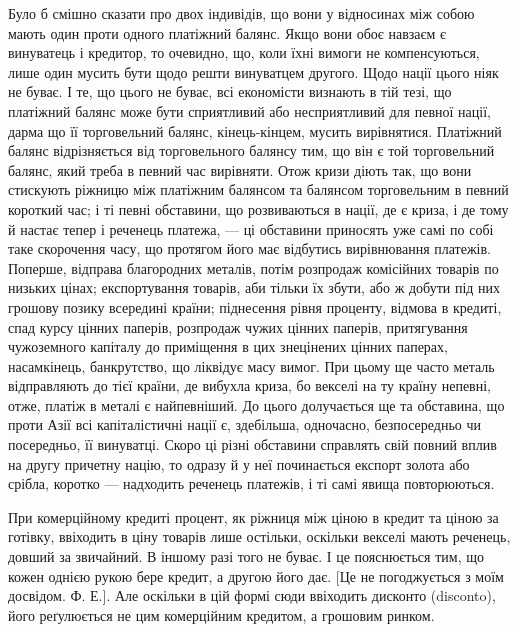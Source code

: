 Було б смішно сказати про двох індивідів, що вони у відносинах між собою
мають один проти одного платіжний балянс. Якщо вони обоє навзаєм є
винуватець і кредитор, то очевидно, що, коли їхні вимоги не компенсуються,
лише один мусить бути щодо решти винуватцем другого. Щодо нації цього
ніяк не буває. І те, що цього не буває, всі економісти визнають в тій тезі,
що платіжний балянс може бути сприятливий або несприятливий для певної
нації, дарма що її торговельний балянс, кінець-кінцем, мусить вирівнятися.
Платіжний балянс відрізняється від торговельного балянсу тим, що він є той
торговельний балянс, який треба в певний час вирівняти. Отож кризи діють так,
що вони стискують ріжницю між платіжним балянсом та балянсом торговельним
в певний короткий час; і ті певні обставини, що розвиваються в нації, де є
криза, і де тому й настає тепер і реченець платежа, — ці обставини приносять уже
самі по собі таке скорочення часу, що протягом його має відбутись вирівнювання
платежів. Поперше, відправа благородних металів, потім розпродаж комісійних
товарів по низьких цінах; експортування товарів, аби тільки їх збути, або ж
добути під них грошову позику всередині країни; піднесення рівня проценту,
відмова в кредиті, спад курсу цінних паперів, розпродаж чужих цінних паперів,
притягування чужоземного капіталу до приміщення в цих знецінених цінних
паперах, насамкінець, банкрутство, що ліквідує масу вимог. При цьому ще часто
металь відправляють до тієї країни, де вибухла криза, бо векселі на ту країну
непевні, отже, платіж в металі є найпевніший. До цього долучається ще та
обставина, що проти Азії всі капіталістичні нації є, здебільша, одночасно, безпосередньо
чи посередньо, її винуватці. Скоро ці різні обставини справлять свій повний
вплив на другу причетну націю, то одразу й у неї починається експорт золота або
срібла, коротко — надходить реченець платежів, і ті самі явища повторюються.

При комерційному кредиті процент, як ріжниця між ціною в кредит та
ціною за готівку, ввіходить в ціну товарів лише остільки, оскільки векселі
мають реченець, довший за звичайний. В іншому разі того не буває. І це пояснюється
тим, що кожен однією рукою бере кредит, а другою його дає. [Це не погоджується
з моїм досвідом. Ф. Е.]. Але оскільки в цій формі сюди ввіходить
дисконто (disconto), його реґулюється не цим комерційним кредитом, а грошовим
ринком.

